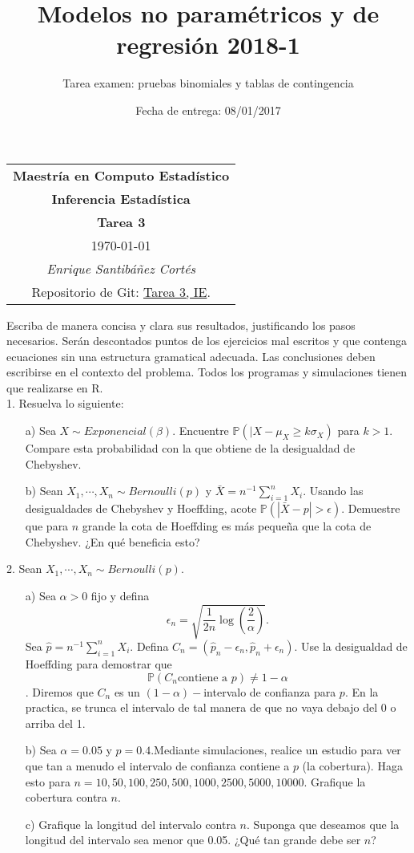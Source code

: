 \documentclass[11pt,letterpaper]{article}
\title{Modelos no paramétricos y de regresión 2018-1}
\author{Tarea examen: pruebas binomiales y tablas de contingencia}
\date{Fecha de entrega: 08/01/2017}
\newcommand{\mP}{\mathbb{P}}
\begin{document}
\begin{table}[ht]
\centering
\begin{tabular}{c}
\textbf{Maestría en Computo Estadístico}\\
\textbf{Inferencia Estadística} \\
\textbf{Tarea 3}\\
\today \\
\emph{Enrique Santibáñez Cortés}\\
Repositorio de Git: \href{https://github.com/Enriquesec/Inferencia_Estad-stica/tree/master/Tareas/Tarea_3}{Tarea 3, IE}.
\end{tabular}
\end{table}
Escriba de manera concisa y clara sus resultados, justificando los pasos necesarios. Serán descontados puntos de los ejercicios mal escritos y que contenga ecuaciones sin una estructura gramatical adecuada. Las conclusiones deben escribirse en el contexto del problema. Todos los programas y
simulaciones tienen que realizarse en R.\\

1. Resuelva lo siguiente:

\begin{itemize}
\item[a)] Sea $X\sim Exponencial(\beta)$. Encuentre $\mP(|X-\mu_X\geq k\sigma_X)$ para $k>1$. Compare esta probabilidad con la que obtiene de la desigualdad de Chebyshev. 

\item[b)] Sean $X_1,\cdots,X_n\sim Bernoulli(p)$ y $\bar{X}=n^{-1}\sum_{i=1}^n X_i$. Usando las desigualdades de Chebyshev y Hoeffding, acote $\mP(|\bar{X}-p|>\epsilon)$. Demuestre que para $n$ grande la cota de Hoeffding es más pequeña que la cota de Chebyshev. ¿En qué beneficia esto?
\end{itemize}

2. Sean  $X_1,\cdots,X_n\sim Bernoulli(p)$.
\begin{itemize}
\item[a)] Sea $\alpha >0 $ fijo y defina 
$$\epsilon_n = \sqrt{\frac{1}{2n} \log\left(\frac{2}{\alpha}\right)}.$$
Sea $\hat{p}=n^{-1}\sum_{i=1}^n X_i.$ Defina $C_n=(\hat{p}_n-\epsilon_n,\hat{p}_n+\epsilon_n)$. Use la desigualdad de Hoeffding para demostrar que $$\mP(C_n \text{contiene a } p)\neq 1-\alpha$$.
Diremos que $C_n$ es un $(1-\alpha)-$intervalo de confianza para $p$. En la practica, se trunca el intervalo de tal manera de que no vaya debajo del 0 o arriba del 1.

\item[b)] Sea $\alpha=0.05$ y $p=0.4$.Mediante simulaciones, realice un estudio para ver que tan a menudo el intervalo de confianza contiene a $p$ (la cobertura). Haga esto para $n=
10, 50, 100, 250, 500, 1000, 2500, 5000, 10000$. Grafique la cobertura contra $n$.

\item[c)] Grafique la longitud del intervalo contra $n$. Suponga que deseamos que la longitud del intervalo sea menor que 0.05. ¿Qué tan grande debe ser $n$?
\end{itemize}
\end{document}
